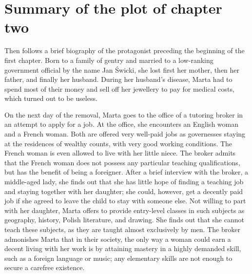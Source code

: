 \section{Summary of the plot of chapter two}

Then follows a brief biography of the protagonist preceding the beginning of the first chapter.
Born to a family of gentry and married to a low-ranking government official by the name Jan Świcki, she lost first her mother, then her father, and finally her husband.
During her husband's disease, Marta had to spend most of their money and sell off her jewellery to pay for medical costs, which turned out to be useless.

On the next day of the removal, Marta goes to the office of a tutoring broker in an attempt to apply for a job.
At the office, she encounters an English woman and a French woman.
Both are offered very well-paid jobs as governesses staying at the residences of wealthy counts, with very good working conditions.
The French woman is even allowed to live with her little niece.
The broker admits that the French woman does not possess any particular teaching qualifications, but has the benefit of being a foreigner.
After a brief interview with the broker, a middle-aged lady, she finds out that she has little hope of finding a teaching job and staying together with her daughter; she could, however, get a decently paid job if she agreed to leave the child to stay with someone else.
Not willing to part with her daughter, Marta offers to provide entry-level classes in such subjects as geography, history, Polish literature, and drawing.
She finds out that she cannot teach these subjects, as they are taught almost exclusively by men.
The broker admonishes Marta that in their society, the only way a woman could earn a decent living with her work is by attaining mastery in a highly demanded skill, such as a foreign language or music; any elementary skills are not enough to secure a carefree existence.
